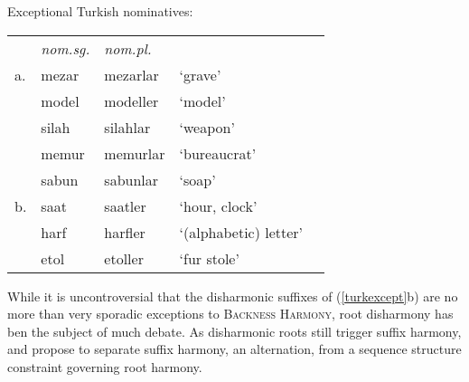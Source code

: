 \begin{example}
\label{turkexcept}
Exceptional Turkish nominatives:

\begin{tabular}{l l l l l}
   & \emph{nom.sg.} & \emph{nom.pl.} \\
a. & mezar          & mezarlar       & `grave' & \citep{TELL} \\
   & model          & modeller       & `model' \\
   & silah          & silahlar       & `weapon'     \\
   & memur          & memurlar       & `bureaucrat' \\
   & sabun          & sabunlar       & `soap'       \\
b. & saat           & saatler        & `hour, clock' \\
   & harf           & harfler        & `(alphabetic) letter' \\ %
   & etol           & etoller        & `fur stole' \\
\end{tabular}
\end{example}

While it is uncontroversial that the disharmonic suffixes of (\ref{turkexcept}b) are no more than very sporadic exceptions to \textsc{Backness Harmony}, root disharmony has ben the subject of much debate. As disharmonic roots still trigger suffix harmony, \citet[][212, 289]{Anderson1974} and \citet{Iverson1978} propose to separate suffix harmony, an alternation, from a sequence structure constraint governing root harmony. 

